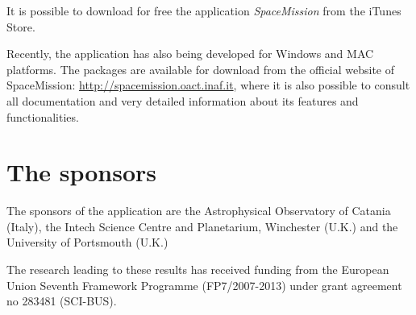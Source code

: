 It is possible to download for free the application \emph{SpaceMission} from the iTunes Store.

Recently, the application has also being developed for Windows and MAC platforms. The packages are available for download from the official website of SpaceMission: 
\url{http://spacemission.oact.inaf.it}, where it is also possible to consult  all documentation and very detailed information about its features and functionalities.

\section{The sponsors}
The sponsors of the application are the Astrophysical Observatory of Catania (Italy), the Intech Science Centre and Planetarium, Winchester  (U.K.) and the University of Portsmouth (U.K.)

\acknowledgements The research leading to these results has received funding from the European Union Seventh Framework Programme (FP7/2007-2013) under grant agreement no 283481 (SCI-BUS).
